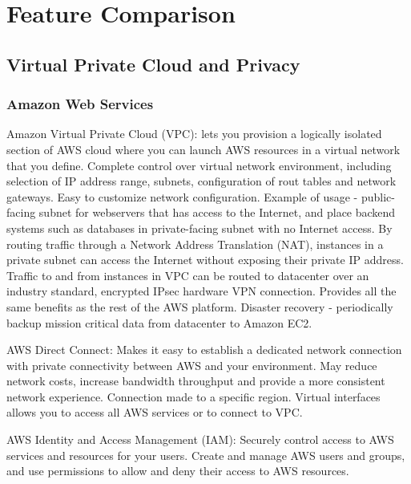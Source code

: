 \section{Feature Comparison}

\subsection{Virtual Private Cloud and Privacy}

\subsubsection{Amazon Web Services}
Amazon Virtual Private Cloud (VPC): lets you provision a logically isolated section of AWS cloud where you can launch AWS resources in a virtual network that you define. Complete control over virtual network environment, including selection of IP address range, subnets, configuration of rout tables and network gateways. Easy to customize network configuration. Example of usage - public-facing subnet for webservers that has access to the Internet, and place backend systems such as databases in private-facing subnet with no Internet access. By routing traffic through a Network Address Translation (NAT), instances in a private subnet can access the Internet without exposing their private IP address. Traffic to and from instances in VPC can be routed to datacenter over an industry standard, encrypted IPsec hardware VPN connection.  Provides all the same benefits as the rest of the AWS platform. Disaster recovery - periodically backup mission critical data from datacenter to Amazon EC2. 

AWS Direct Connect: Makes it easy to establish a dedicated network connection with private connectivity between AWS and your environment. May reduce network costs, increase bandwidth throughput and provide a more consistent network experience. Connection made to a specific region. Virtual interfaces allows you to access all AWS services or to connect to VPC. 

AWS Identity and Access Management (IAM): Securely control access to AWS services and resources for your users. Create and manage AWS users and groups, and use permissions to allow and deny their access to AWS resources. 

